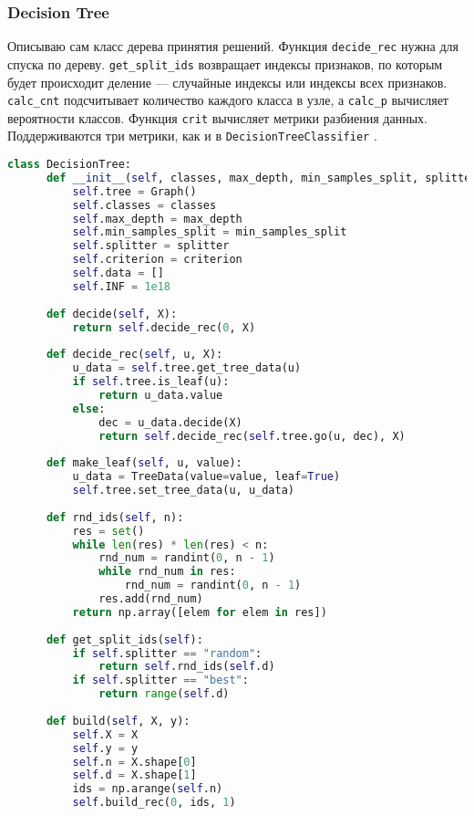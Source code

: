 \subsubsection{Decision Tree}
Описываю сам класс дерева принятия решений. Функция \texttt{decide\_rec} нужна для спуска по дереву. \texttt{get\_split\_ids} возвращает индексы признаков, по которым будет происходит деление --- случайные индексы или индексы всех признаков. \texttt{calc\_cnt} подсчитывает количество каждого класса в узле, а \texttt{calc\_p} вычисляет вероятности классов. Функция \texttt{crit} вычисляет метрики разбиения данных. Поддерживаются три метрики, как и в \texttt{DecisionTreeClassifier} \cite{dtc}.
\begin{lstlisting}[language=python, keepspaces=true]
class DecisionTree:
      def __init__(self, classes, max_depth, min_samples_split, splitter, criterion):
          self.tree = Graph()
          self.classes = classes
          self.max_depth = max_depth
          self.min_samples_split = min_samples_split
          self.splitter = splitter
          self.criterion = criterion
          self.data = []
          self.INF = 1e18
  
      def decide(self, X):
          return self.decide_rec(0, X)
  
      def decide_rec(self, u, X):
          u_data = self.tree.get_tree_data(u)
          if self.tree.is_leaf(u):
              return u_data.value
          else:
              dec = u_data.decide(X)
              return self.decide_rec(self.tree.go(u, dec), X)
  
      def make_leaf(self, u, value):
          u_data = TreeData(value=value, leaf=True)
          self.tree.set_tree_data(u, u_data)
  
      def rnd_ids(self, n):
          res = set()
          while len(res) * len(res) < n:
              rnd_num = randint(0, n - 1)
              while rnd_num in res:
                  rnd_num = randint(0, n - 1)
              res.add(rnd_num)
          return np.array([elem for elem in res])
      
      def get_split_ids(self):
          if self.splitter == "random":
              return self.rnd_ids(self.d)
          if self.splitter == "best":
              return range(self.d)
  
      def build(self, X, y):
          self.X = X
          self.y = y
          self.n = X.shape[0]
          self.d = X.shape[1]
          ids = np.arange(self.n)
          self.build_rec(0, ids, 1)
  

\end{lstlisting}
